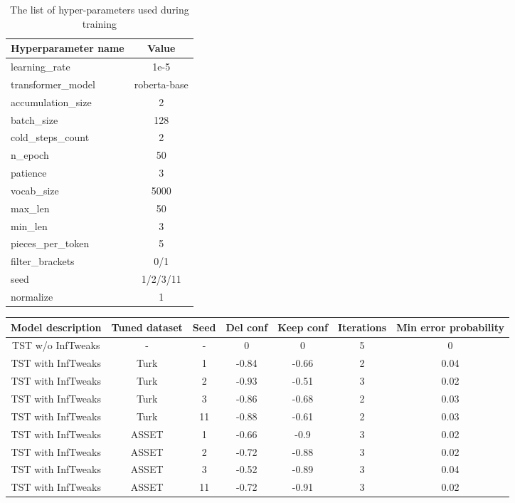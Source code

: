 \documentclass[11pt,a4paper]{article}
\begin{document}
{\begin{table}[H]
\begin{center}
\small
\begin{tabular}{lc}
\toprule
\textbf{Hyperparameter name} & \textbf{Value} \\
\toprule
learning\_rate & 1e-5\\
transformer\_model & roberta-base \\
accumulation\_size & 2 \\
batch\_size & 128 \\
cold\_steps\_count & 2 \\
n\_epoch & 50 \\
patience & 3 \\
vocab\_size & 5000 \\
max\_len & 50 \\
min\_len & 3 \\
pieces\_per\_token & 5 \\
filter\_brackets & 0/1 \\
seed & 1/2/3/11 \\
normalize & 1 \\
\bottomrule
\end{tabular}
\caption{The list of hyper-parameters used during training}
\label{tab:hyperparameters}
\end{center}
\end{table}


\begin{table*}[b]
\begin{center}
\small
\begin{tabular}{ccccccc}
\toprule
\textbf{Model description} & \textbf{Tuned dataset} & \textbf{Seed} & \textbf{Del conf} &	\textbf{Keep conf} & \textbf{Iterations} &	\textbf{Min error probability}  \\
\toprule
TST w/o InfTweaks & - & - & 0 & 0 & 5 & 0 \\
TST with InfTweaks & Turk & 1 & -0.84 &	-0.66 &	2 & 0.04 \\
TST with InfTweaks & Turk & 2 &	-0.93 &	-0.51 &	3 &	0.02 \\
TST with InfTweaks & Turk & 3	&-0.86 &	-0.68 &	2 &	0.03 \\
TST with InfTweaks & Turk & 11	& -0.88 & -0.61 &	2 &	0.03 \\
TST with InfTweaks & ASSET & 1 & -0.66 &	-0.9 &	3 & 0.02 \\
TST with InfTweaks & ASSET & 2 & -0.72 &	-0.88 &	3 &	0.02 \\
TST with InfTweaks & ASSET & 3	& -0.52 &	-0.89 &	3 & 0.04 \\
TST with InfTweaks & ASSET & 11	& -0.72 &	-0.91 &	3 &	0.02 \\



\end{tabular}
\end{center}
\end{table*}}
\end{document}
